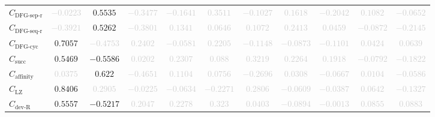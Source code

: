 \documentclass{standalone}
\newcommand{\dfgseprationame}{\text{DFG-sep-r}}
\newcommand{\dfgsepratio}{C_{\dfgseprationame}}
\newcommand{\dfgseqrationame}{\text{DFG-seq-r}}
\newcommand{\dfgseqratio}{C_{\dfgseqrationame}}
\newcommand{\dfgcycname}{\text{DFG-cyc}}
\newcommand{\dfgcyc}{C_{\dfgcycname}}
\newcommand{\numberofneighborhoodsname}{\text{succ}}
\newcommand{\numberofneighborhoods}{C_{\numberofneighborhoodsname}}
\newcommand{\lempelzivname}{\text{LZ}}
\newcommand{\lempelziv}{C_{\lempelzivname}}
\newcommand{\affinityname}{\text{affinity}}
\newcommand{\affinity}{C_{\affinityname}}
\newcommand{\deviationfromrandomname}{\text{dev-R}}
\newcommand{\deviationfromrandom}{C_{\deviationfromrandomname}}
\begin{document}
\begin{tabular}{lcccccccccc}
$\dfgsepratio$ & \textcolor{lightgray}{$-0.0223$} & $0.5535$ & \textcolor{lightgray}{$-0.3477$} & \textcolor{lightgray}{$-0.1641$} & \textcolor{lightgray}{$0.3511$} & \textcolor{lightgray}{$-0.1027$} & \textcolor{lightgray}{$0.1618$} & \textcolor{lightgray}{$-0.2042$} & \textcolor{lightgray}{$0.1082$} & \textcolor{lightgray}{$-0.0652$} \\ 
$\dfgseqratio$ & \textcolor{lightgray}{$-0.3921$} & $0.5262$ & \textcolor{lightgray}{$-0.3801$} & \textcolor{lightgray}{$0.1341$} & \textcolor{lightgray}{$0.0646$} & \textcolor{lightgray}{$0.1072$} & \textcolor{lightgray}{$0.2413$} & \textcolor{lightgray}{$0.0459$} & \textcolor{lightgray}{$-0.0872$} & \textcolor{lightgray}{$-0.2145$} \\ 
$\dfgcyc$ & $0.7057$ & \textcolor{lightgray}{$-0.4753$} & \textcolor{lightgray}{$0.2402$} & \textcolor{lightgray}{$-0.0581$} & \textcolor{lightgray}{$0.2205$} & \textcolor{lightgray}{$-0.1148$} & \textcolor{lightgray}{$-0.0873$} & \textcolor{lightgray}{$-0.1101$} & \textcolor{lightgray}{$0.0424$} & \textcolor{lightgray}{$0.0639$} \\ 
$\numberofneighborhoods$ & $0.5469$ & $-0.5586$ & \textcolor{lightgray}{$0.0202$} & \textcolor{lightgray}{$0.2307$} & \textcolor{lightgray}{$0.088$} & \textcolor{lightgray}{$0.3219$} & \textcolor{lightgray}{$0.2264$} & \textcolor{lightgray}{$0.1918$} & \textcolor{lightgray}{$-0.0792$} & \textcolor{lightgray}{$-0.1822$} \\ 
$\affinity$ & \textcolor{lightgray}{$0.0375$} & $0.622$ & \textcolor{lightgray}{$-0.4651$} & \textcolor{lightgray}{$0.1104$} & \textcolor{lightgray}{$0.0756$} & \textcolor{lightgray}{$-0.2696$} & \textcolor{lightgray}{$0.0308$} & \textcolor{lightgray}{$-0.0667$} & \textcolor{lightgray}{$0.0104$} & \textcolor{lightgray}{$-0.0586$} \\ 
$\lempelziv$ & $0.8406$ & \textcolor{lightgray}{$0.2905$} & \textcolor{lightgray}{$-0.0225$} & \textcolor{lightgray}{$-0.0634$} & \textcolor{lightgray}{$-0.2271$} & \textcolor{lightgray}{$0.2806$} & \textcolor{lightgray}{$-0.0609$} & \textcolor{lightgray}{$-0.0387$} & \textcolor{lightgray}{$0.0642$} & \textcolor{lightgray}{$-0.1327$} \\ 
$\deviationfromrandom$ & $0.5557$ & $-0.5217$ & \textcolor{lightgray}{$0.2047$} & \textcolor{lightgray}{$0.2278$} & \textcolor{lightgray}{$0.323$} & \textcolor{lightgray}{$0.0403$} & \textcolor{lightgray}{$-0.0894$} & \textcolor{lightgray}{$-0.0013$} & \textcolor{lightgray}{$0.0855$} & \textcolor{lightgray}{$0.0883$} \\ 

\end{tabular}
\end{document}
